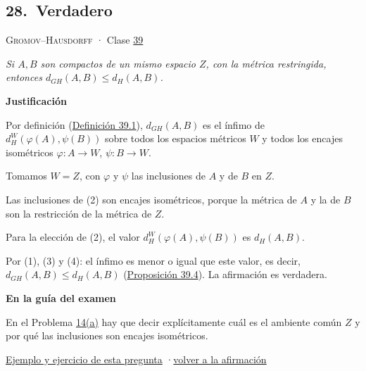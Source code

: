 \documentclass[11pt,a4paper]{article}
\newcommand{\bloque}[1]{\par\smallskip\noindent\textbf{\color{acento}#1}\par}
\begin{document}
\subsection*{\hypertarget{r-28}{}28.\ \textcolor{ok}{Verdadero}}
{\small \textsc{Gromov–Hausdorff} · Clase \href{https://decostruttivismo.github.io/MAT2514-repaso/pdf/MAT2514_apuntes_completos.pdf\#nameddest=section.39}{39}}\par
\emph{Si $A,B$ son compactos de un mismo espacio $Z$, con la métrica restringida, entonces $d_{GH}(A,B)\le d_H(A,B)$.}
\bloque{Justificación}
\begin{pasos}
\item[(1)] Por definición (\href{https://decostruttivismo.github.io/MAT2514-repaso/pdf/MAT2514_apuntes_completos.pdf\#nameddest=teorema.39.1}{Definición 39.1}), $d_{GH}(A,B)$ es el ínfimo de $d_H^W(\varphi(A),\psi(B))$ sobre todos los espacios métricos $W$ y todos los encajes isométricos $\varphi\colon A\to W$, $\psi\colon B\to W$.
\item[(2)] Tomamos $W=Z$, con $\varphi$ y $\psi$ las inclusiones de $A$ y de $B$ en $Z$.
\item[(3)] Las inclusiones de (2) son encajes isométricos, porque la métrica de $A$ y la de $B$ son la restricción de la métrica de $Z$.
\item[(4)] Para la elección de (2), el valor $d_H^W(\varphi(A),\psi(B))$ es $d_H(A,B)$.
\item[] Por (1), (3) y (4): el ínfimo es menor o igual que este valor, es decir, $d_{GH}(A,B)\le d_H(A,B)$ (\href{https://decostruttivismo.github.io/MAT2514-repaso/pdf/MAT2514_apuntes_completos.pdf\#nameddest=teorema.39.4}{Proposición 39.4}). La afirmación es verdadera.
\end{pasos}
\bloque{En la guía del examen}
\begin{pasos}
\item[] En el Problema \hyperlink{prob-14}{14(a)} hay que decir explícitamente cuál es el ambiente común $Z$ y por qué las inclusiones son encajes isométricos.
\end{pasos}
\par{}
\par{\small \hyperlink{e-28}{Ejemplo y ejercicio de esta pregunta} \quad·\quad \hyperlink{q-28}{volver a la afirmación}}
\end{document}
